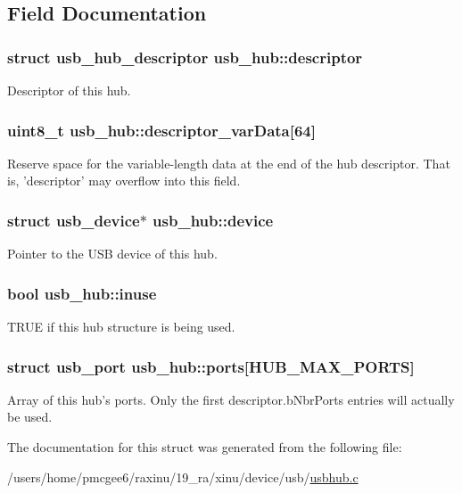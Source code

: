 \subsection{Field Documentation}
\hypertarget{structusb__hub_a26e8912e4d2f0b850e01d729d9057277}{
\subsubsection[{descriptor}]{\setlength{\rightskip}{0pt plus 5cm}struct usb\-\_\-hub\-\_\-descriptor usb\-\_\-hub\-::descriptor}}\label{structusb__hub_a26e8912e4d2f0b850e01d729d9057277}
Descriptor of this hub. \hypertarget{structusb__hub_a91257987cdc0c02ea8814d9d84889d4a}{
\subsubsection[{descriptor\-\_\-var\-Data}]{\setlength{\rightskip}{0pt plus 5cm}uint8\-\_\-t usb\-\_\-hub\-::descriptor\-\_\-var\-Data\mbox{[}64\mbox{]}}}\label{structusb__hub_a91257987cdc0c02ea8814d9d84889d4a}
Reserve space for the variable-\/length data at the end of the hub descriptor. That is, 'descriptor' may overflow into this field. \hypertarget{structusb__hub_a45058f0f3009116d905d6705f15d3654}{
\subsubsection[{device}]{\setlength{\rightskip}{0pt plus 5cm}struct usb\-\_\-device$\ast$ usb\-\_\-hub\-::device}}\label{structusb__hub_a45058f0f3009116d905d6705f15d3654}
Pointer to the U\-S\-B device of this hub. \hypertarget{structusb__hub_ace7d53e067ed6a06c16e1949b0d322dc}{
\subsubsection[{inuse}]{\setlength{\rightskip}{0pt plus 5cm}bool usb\-\_\-hub\-::inuse}}\label{structusb__hub_ace7d53e067ed6a06c16e1949b0d322dc}
T\-R\-U\-E if this hub structure is being used. \hypertarget{structusb__hub_a4a1238ce43bf4705ca6de079ad0ec86c}{
\subsubsection[{ports}]{\setlength{\rightskip}{0pt plus 5cm}struct {\bf usb\-\_\-port} usb\-\_\-hub\-::ports\mbox{[}{\bf H\-U\-B\-\_\-\-M\-A\-X\-\_\-\-P\-O\-R\-T\-S}\mbox{]}}}\label{structusb__hub_a4a1238ce43bf4705ca6de079ad0ec86c}
Array of this hub's ports. Only the first descriptor.\-b\-Nbr\-Ports entries will actually be used. 

The documentation for this struct was generated from the following file\-:\begin{DoxyCompactItemize}
\item 
/users/home/pmcgee6/raxinu/19\-\_\-ra/xinu/device/usb/\hyperlink{usbhub_8c}{usbhub.\-c}\end{DoxyCompactItemize}
